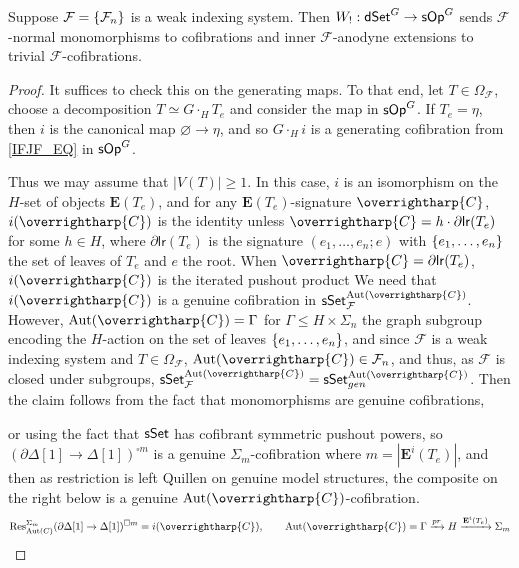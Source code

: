 \documentclass[a4paper,10pt
,draft
]{article}%
\renewcommand{\F}{\mathcal F}
\renewcommand{\1}{\eta}%
\newcommand{\vect}[1]{\text{\overrightharp{\ensuremath{#1}}}}
\begin{document}
\begin{proposition}
      \label{W!_COF_PROP}
      Suppose $\F = \set{\F_n}$ is a weak indexing system.
      Then $W_!: \mathsf{dSet}^G \to \mathsf{sOp}^G$ sends $\F$-normal monomorphisms to cofibrations and inner $\F$-anodyne extensions to trivial $\F$-cofibrations.
\end{proposition}
\begin{proof}
      It suffices to check this on the generating maps.
      To that end, let $T \in \Omega_\F$, choose a decomposition $T \simeq G \cdot_H T_e$ and consider the map
      in $\mathsf{sOp}^G$.
      If $T_e = \eta$, then $i$ is the canonical map $\varnothing \to \eta$,
      and so $G \cdot_H i$ is a generating cofibration from \eqref{IFJF_EQ} in $\mathsf{sOp}^G$.

      Thus we may assume that $|V(T)| \geq 1$.
      In this case, $i$ is an isomorphism on the $H$-set of objects $\mathbf E(T_e)$,
      and for any $\mathbf E(T_e)$-signature $\vect C$,
      $i(\vect C)$ is the identity unless $\vect C = h \cdot \partial \mathsf{lr}(T_e)$ for some $h \in H$,
      where $\partial \mathsf{lr}(T_e)$ is the signature $(e_1, \dots, e_n; e)$ 
      with $\left\{e_1,\dots, e_n\right\}$ the set of leaves of $T_e$ and $e$ the root.
      When $\vect C = \partial \mathsf{lr}(T_e)$, $i(\vect C)$ is the iterated pushout product
      We need that $i(\vect C)$ is a genuine cofibration in $\sSet^{\Aut(\vect C)}_\F$.
      However, $\Aut(\vect C) = \Gamma$ for $\Gamma \leq H \times \Sigma_n$ the graph subgroup encoding the $H$-action on the set of leaves $\left\{e_1, \dots, e_n\right\}$,
      and since $\F$ is a weak indexing system and $T \in \Omega_\F$,
      $\Aut(\vect C) \in \F_n$,
      and thus, as $\F$ is closed under subgroups, $\sSet^{\Aut(\vect C)}_\F = \sSet^{\Aut(\vect C)}_{gen}$.
      Then the claim follows from the fact that monomorphisms are genuine cofibrations,
      {\color{OliveGreen} %
        or using the fact that $\mathsf{sSet}$ has cofibrant symmetric pushout powers,
        so $(\partial \Delta[1] \to \Delta[1])^{\square m}$ is a genuine $\Sigma_m$-cofibration where $m = |\mathbf E^i(T_e)|$,
        and then as restriction is left Quillen on genuine model structures,
        the composite on the right below is a genuine $\Aut(\vect C)$-cofibration.
        \[
              \mathrm{Res}^{\Sigma_m}_{\Aut(C)}(\partial \Delta[1] \to \Delta[1])^{\square m} = i(\vect C),
              \qquad
              \Aut(\vect C) = \Gamma \xrightarrow{pr} H \xrightarrow{\mathbf E^i(T_e)} \Sigma_m
        \]

}
\end{proof}
\end{document}

